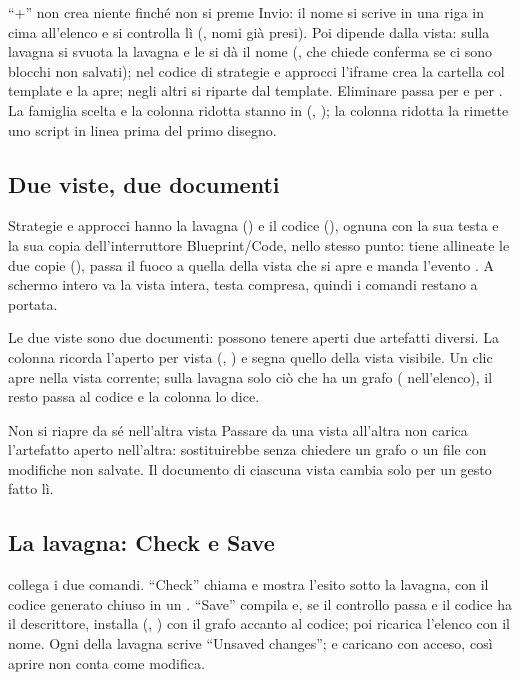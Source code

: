 \noindent
\enquote{+} non crea niente finché non si preme Invio: il nome si scrive in
una riga in cima all'elenco e si controlla lì (\cod{[a-z][a-z0-9\_]*}, nomi
già presi). Poi dipende dalla vista: sulla lavagna si svuota la lavagna e
le si dà il nome (, che chiede conferma se ci
sono blocchi non salvati); nel codice di strategie e approcci l'iframe crea
la cartella col template e la apre; negli altri si riparte dal template.
Eliminare passa per  e per
.
La famiglia scelta e la colonna ridotta stanno in 
(, ); la colonna ridotta la rimette
uno script in linea prima del primo disegno.

\subsection{Due viste, due documenti}

Strategie e approcci hanno la lavagna () e il codice
(), ognuna con la sua testa  e la sua copia
dell'interruttore Blueprint/Code, nello stesso punto:  tiene
allineate le due copie (), passa il fuoco a quella della
vista che si apre e manda l'evento . A schermo intero va la
vista intera, testa compresa, quindi i comandi restano a portata.

Le due viste sono due documenti: possono tenere aperti due artefatti
diversi. La colonna ricorda l'aperto per vista (, ) e
segna quello della vista visibile. Un clic apre nella vista corrente; sulla
lavagna solo ciò che ha un grafo ( nell'elenco), il resto
passa al codice e la colonna lo dice.

\begin{perche}{Non si riapre da sé nell'altra vista}
Passare da una vista all'altra non carica l'artefatto aperto nell'altra:
sostituirebbe senza chiedere un grafo o un file con modifiche non salvate.
Il documento di ciascuna vista cambia solo per un gesto fatto lì.
\end{perche}

\subsection{La lavagna: Check e Save}

 collega i due comandi. \enquote{Check} chiama
 e mostra l'esito sotto la lavagna, con il
codice generato chiuso in un . \enquote{Save} compila e, se il
controllo passa e il codice ha il descrittore, installa
(, )
con il grafo accanto al codice; poi ricarica l'elenco con il nome. Ogni
 della lavagna scrive \enquote{Unsaved changes};
 e  caricano con
 acceso, così aprire non conta come modifica.

